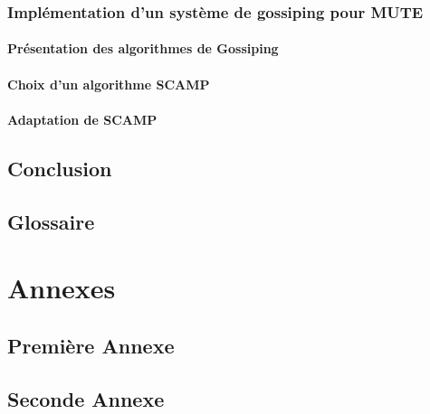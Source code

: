 \documentclass{tnreport}
\begin{document}
\section{Implémentation d'un système de gossiping pour MUTE}

\subsection{Présentation des algorithmes de Gossiping}

\subsection{Choix d'un algorithme SCAMP}

\subsection{Adaptation de SCAMP}

\chapter{Conclusion}

\cleardoublepage

\renewcommand{\tocbibname}{Bibliographie / Webographie}

\nocite{*}


\cleardoublepage

\listoffigures
\cleardoublepage

\listoftables
\cleardoublepage

\chapter*{Glossaire}

\cleardoublepage
\renewcommand{\thesubsection}{\Roman{subsection}}

\appendix
\part*{Annexes}
\cleardoublepage

\chapter{Première Annexe}
\cleardoublepage

\chapter{Seconde Annexe}
\end{document}
